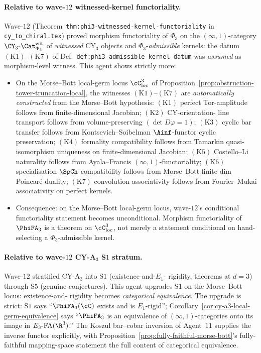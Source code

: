 \paragraph{Relative to wave-$12$ witnessed-kernel functoriality.}
Wave-$12$ (Theorem~\texttt{thm:phi3-witnessed-kernel-functoriality} in
\texttt{cy\_to\_chiral.tex}) proved morphism functoriality of $\Phi_3$
on the $(\infty,1)$-category
$\CY_3\text{-}\Cat_{\Phi_3}^{\mathrm{wit}}$ of
\emph{witnessed} CY$_3$ objects and $\Phi_3$-\emph{admissible} kernels:
the datum $(\mathrm{K1})$--$(\mathrm{K7})$ of
Def.~\texttt{def:phi3-admissible-kernel-datum} was \emph{assumed} as
morphism-level witness.  This agent shows strictly more:
\begin{itemize}
 \item On the Morse--Bott local-germ locus $\cC_{\mathrm{loc}}^3$ of
       Proposition~\ref{prop:obstruction-tower-truncation-local},
       the witnesses $(\mathrm{K1})$--$(\mathrm{K7})$ are
       \emph{automatically constructed} from the Morse--Bott
       hypothesis: $(\mathrm{K1})$ perfect Tor-amplitude follows from
       finite-dimensional Jacobian; $(\mathrm{K2})$ CY-orientation-
       line transport follows from volume-preserving
       $(\det D\varphi = 1)$; $(\mathrm{K3})$ cyclic bar transfer
       follows from Kontsevich--Soibelman $\Ainf$-functor cyclic
       preservation; $(\mathrm{K4})$ formality compatibility follows
       from Tamarkin quasi-isomorphism uniqueness on finite-dimensional
       Jacobian; $(\mathrm{K5})$ Costello--Li naturality follows from
       Ayala--Francis $(\infty,1)$-functoriality; $(\mathrm{K6})$
       specialisation $\SpCh$-compatibility follows from Morse--Bott
       finite-dim Poincar\'e duality; $(\mathrm{K7})$ convolution
       associativity follows from Fourier--Mukai associativity on
       perfect kernels.
 \item Consequence: on the Morse--Bott local-germ locus, wave-$12$'s
       conditional functoriality statement becomes unconditional.
       Morphism functoriality of $\PhiFA_3$ is a theorem on
       $\cC_{\mathrm{loc}}^3$, not merely a statement conditional on
       hand-selecting a $\Phi_3$-admissible kernel.
\end{itemize}

\paragraph{Relative to wave-$12$ CY-A$_3$ S$1$ stratum.}
Wave-$12$ stratified CY-A$_3$ into S$1$ (existence-and-$E_1$-
rigidity, theorems at $d = 3$) through S$5$ (genuine conjectures).
This agent upgrades S$1$ on the Morse--Bott locus: existence-and-
rigidity becomes \emph{categorical equivalence}.  The upgrade is
strict: S$1$ says ``$\PhiFA_3(\cC)$ exists and is $E_1$-rigid'';
Corollary~\ref{cor:cy-a3-local-germ-equivalence} says ``$\PhiFA_3$ is
an equivalence of $(\infty,1)$-categories onto its image in
$E_3\text{-FA}(\R^3)$.''  The Koszul bar--cobar inversion of
Agent~$11$ supplies the inverse functor explicitly, with
Proposition~\ref{prop:fully-faithful-morse-bott}'s fully-faithful
mapping-space statement the full content of categorical equivalence.


